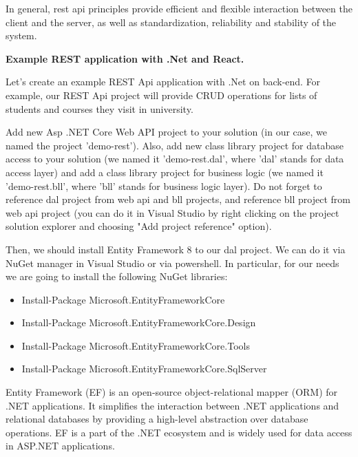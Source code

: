 In general, rest api principles provide efficient and flexible interaction between the client and the server, as well as standardization, reliability and stability of the system.


\medskip
\medskip

\begin{center}
\textbf{Example REST application with .Net and React.}
\end{center}


\medskip

Let's create an example REST Api application with .Net on back-end. For example, our REST Api project will provide CRUD operations for lists of students and courses they visit in university.

Add new Asp .NET Core Web API project to your solution (in our case, we named the project 'demo-rest'). Also, add new class library project for database access to your solution (we named it 'demo-rest.dal', where 'dal' stands for data access layer) and add a class library project for business logic (we named it 'demo-rest.bll', where 'bll' stands for business logic layer). Do not forget to reference dal project from web api and bll projects, and reference bll project from web api project (you can do it in Visual Studio by right clicking on the project solution explorer and choosing "Add project reference" option).

Then, we should install Entity Framework 8 to our dal project. We can do it via NuGet manager in Visual Studio or via powershell. In particular, for our needs we are going to install the following NuGet libraries:

\begin{itemize}
\item Install-Package Microsoft.EntityFrameworkCore

\item Install-Package Microsoft.EntityFrameworkCore.Design

\item Install-Package Microsoft.EntityFrameworkCore.Tools

\item Install-Package Microsoft.EntityFrameworkCore.SqlServer
\end{itemize}

Entity Framework (EF) is an open-source object-relational mapper (ORM) for .NET applications. It simplifies the interaction between .NET applications and relational databases by providing a high-level abstraction over database operations. EF is a part of the .NET ecosystem and is widely used for data access in ASP.NET applications.

